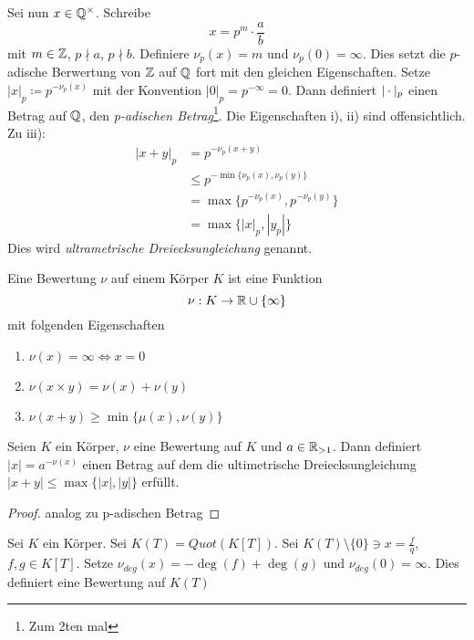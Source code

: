 \documentclass[../main.tex]{subfiles}
\begin{document}
Sei nun $x\in \mathbb{Q}^\times$. Schreibe
$$x=p^m\cdot\frac{a}{b}$$ mit $m\in \mathbb{Z}$, $p\nmid a$, $p\nmid b$.
Definiere $\nu_p(x) = m$ und $\nu_p(0) = \infty$. Dies setzt die $p$-adische Berwertung von $\mathbb{Z}$ auf $\mathbb{Q}$ fort mit den gleichen Eigenschaften.
Setze $|x|_p \coloneqq p^{-\nu_p(x)}$ mit der Konvention $|0|_p = p^{-\infty} = 0$.
Dann definiert $|\cdot|_p$ einen Betrag auf $\mathbb{Q}$, den \emph{p-adischen Betrag}\footnote{Zum 2ten mal}. Die Eigenschaften i), ii) sind offensichtlich.
Zu iii):
\begin{align*}
    |x+y|_p &= p^{-\nu_p(x+y)}\\
    &\leq p^{-\min\{\nu_p(x),\nu_p(y)\}} \\
    &= \max\{p^{-\nu_p(x)}, p^{-\nu_p(y)}\} \\&
    = \max\{|x|_p,|y_p|\}
\end{align*}
Dies wird \emph{ultrametrische Dreiecksungleichung} genannt.
\begin{definition}
    Eine Bewertung $\nu$ auf einem Körper $K$ ist eine Funktion $$\nu:K\rightarrow \mathbb{R}\cup \{\infty\}$$
    mit folgenden Eigenschaften
    \begin{enumerate}[label=\roman*)]
        \item $\nu(x) = \infty \Leftrightarrow x= 0$
        \item $\nu(x\times y) = \nu(x)+\nu(y)$
        \item $\nu(x+y) \geq \min\{\mu(x), \nu(y)\}$ 
    \end{enumerate}
\end{definition}
\begin{lemma}
    Seien $K$ ein Körper, $\nu$ eine Bewertung auf $K$ und $a\in \mathbb{R}_{>1}$. Dann definiert $|x| = a^{-\nu(x)}$ einen Betrag auf dem die ultimetrische Dreiecksungleichung $|x+y| \leq \max\{|x|,|y|\}$ erfüllt.
\end{lemma}
\begin{proof}
    analog zu p-adischen Betrag
\end{proof}
\begin{example}
    Sei $K$ ein Körper. Sei $K(T) = Quot(K[T])$.
    Sei $K(T)\setminus\{0\}\ni x = \frac{f}{q}$, $f,g\in K[T]$.
    Setze $\nu_{deg}(x) = -\deg(f)+\deg(g)$ und $\nu_{deg}(0) = \infty$.
    Dies definiert eine Bewertung auf $K(T)$
\end{example}
\end{document}

